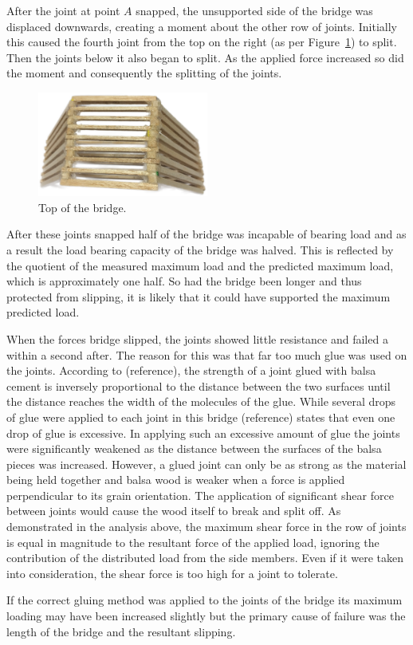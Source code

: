 \documentclass[12pt]{article}
\begin{document}
After the joint at point $A$ snapped, the unsupported side of the bridge was displaced downwards, creating a moment about the other row of joints. Initially this caused the fourth joint from the top on the right (as per Figure~\ref{failtop}) to split. Then the joints below it also began to split. As the applied force increased so did the moment and consequently the splitting of the joints.
		\begin{figure}[h!]
			\centering
			\includegraphics[width=0.5\textwidth]{failtop}
			\caption{Top of the bridge.}
			\label{failtop}
		\end{figure}

After these joints snapped half of the bridge was incapable of bearing load and as a result the load bearing capacity of the bridge was halved. This is reflected by the quotient of the measured maximum load and the predicted maximum load, which is approximately one half. So had the bridge been longer and thus protected from slipping, it is likely that it could have supported the maximum predicted load.

When the forces bridge slipped, the joints showed little resistance and failed a within a second after. The reason for this was that far too much glue was used on the joints. According to (reference), the strength of a joint glued with balsa cement is inversely proportional to the distance between the two surfaces until the distance reaches the width of the molecules of the glue. While several drops of glue were applied to each joint in this bridge (reference) states that even one drop of glue is excessive. In applying such an excessive amount of glue the joints were significantly weakened as the distance between the surfaces of the balsa pieces was increased. However, a glued joint can only be as strong as the material being held together and balsa wood is weaker when a force is applied perpendicular to its grain orientation. The application of significant shear force between joints would cause the wood itself to break and split off. As demonstrated in the analysis above, the maximum shear force in the row of joints is equal in magnitude to the resultant force of the applied load, ignoring the contribution of the distributed load from the side members. Even if it were taken into consideration, the shear force is too high for a joint to tolerate.

If the correct gluing method was applied to the joints of the bridge its maximum loading may have been increased slightly but the primary cause of failure was the length of the bridge and the resultant slipping.

	
\end{document}
